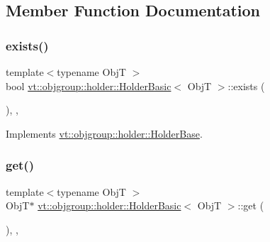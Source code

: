 \subsection{Member Function Documentation}
\mbox{\label{structvt_1_1objgroup_1_1holder_1_1_holder_basic_ab52459a275afea84f6650d206fe5b3dc}} 
\subsubsection{\texorpdfstring{exists()}{exists()}}
{\footnotesize\ttfamily template$<$typename ObjT $>$ \\
bool \hyperlink{structvt_1_1objgroup_1_1holder_1_1_holder_basic}{vt\+::objgroup\+::holder\+::\+Holder\+Basic}$<$ ObjT $>$\+::exists (\begin{DoxyParamCaption}{ }\end{DoxyParamCaption})\hspace{0.3cm}{\ttfamily [inline]}, {\ttfamily [override]}, {\ttfamily [virtual]}}



Implements \hyperlink{structvt_1_1objgroup_1_1holder_1_1_holder_base_afeebbe358baf0b2bfea57f52807be564}{vt\+::objgroup\+::holder\+::\+Holder\+Base}.

\mbox{\label{structvt_1_1objgroup_1_1holder_1_1_holder_basic_af1d605b64e5f9d77d4b291c402133f3f}} 
\subsubsection{\texorpdfstring{get()}{get()}}
{\footnotesize\ttfamily template$<$typename ObjT $>$ \\
ObjT$\ast$ \hyperlink{structvt_1_1objgroup_1_1holder_1_1_holder_basic}{vt\+::objgroup\+::holder\+::\+Holder\+Basic}$<$ ObjT $>$\+::get (\begin{DoxyParamCaption}{ }\end{DoxyParamCaption})\hspace{0.3cm}{\ttfamily [inline]}, {\ttfamily [override]}, {\ttfamily [virtual]}}



